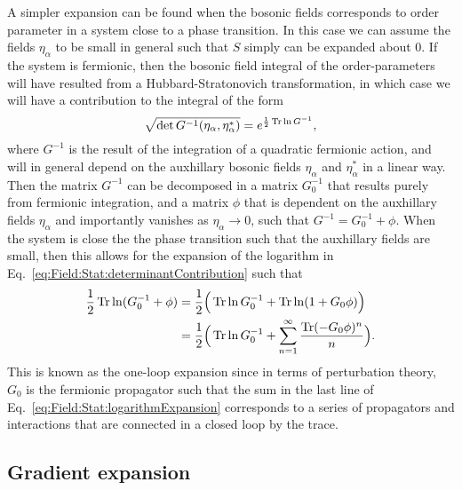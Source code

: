 A simpler expansion can be found when the bosonic fields corresponds to order parameter in a system close to a phase transition. In this case
we can assume the fields $\eta_\alpha$ to be small in general such that $S$ simply can be expanded about $0$. If the system is fermionic, then
the bosonic field integral of the order-parameters will have resulted from a Hubbard-Stratonovich transformation, in which case we will have
a contribution to the integral of the form
\begin{equation}
    \label{eq:Field:Stat:determinantContribution}
    \sqrt{\det G^{-1}(\eta_\alpha,\eta_\alpha^\ast)} = e^{\frac{1}{2}\operatorname{Tr}\ln G^{-1}},
\end{equation}
where $G^{-1}$ is the result of the integration of a quadratic fermionic action, and will in general depend on the auxhillary bosonic fields
$\eta_\alpha$ and $\eta_\alpha^\ast$ in a linear way. Then the matrix $G^{-1}$ can be decomposed in a matrix $G_0^{-1}$ that results purely
from fermionic integration, and a matrix $\phi$ that is dependent on the auxhillary fields $\eta_\alpha$ and importantly vanishes as $\eta_\alpha\to0$,
such that $G^{-1} = G_0^{-1} + \phi$. When the system is close the the phase transition such that the auxhillary fields are small, then this
allows for the expansion of the logarithm in Eq.~\eqref{eq:Field:Stat:determinantContribution} such that
\begin{equation}
    \label{eq:Field:Stat:logarithmExpansion}
    \begin{split}
        \frac{1}{2}\operatorname{Tr}\ln(G_0^{-1} + \phi) &= \frac{1}{2}\Big(\operatorname{Tr}\ln G_0^{-1} + \operatorname{Tr}\ln(1+G_0\phi)\Big)\\
        &= \frac{1}{2}\Big(\operatorname{Tr}\ln G_0^{-1} + \sum_{n=1}^\infty\frac{\operatorname{Tr} (-G_0\phi)^n}{n}\Big).
    \end{split}
\end{equation}
This is known as the one-loop expansion since in terms of perturbation theory, $G_0$ is the fermionic propagator such that the sum in the
last line of Eq.~\eqref{eq:Field:Stat:logarithmExpansion} corresponds to a series of propagators and interactions that are connected in
a closed loop by the trace.

\subsection{Gradient expansion}


